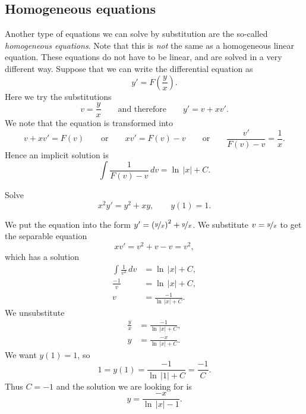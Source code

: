 \subsection{Homogeneous equations}

Another type of equations we can solve by substitution are the 
so-called \emph{homogeneous equations}. Note that this is \emph{not} the same 
as a homogeneous linear equation. These equations do not have to be linear, and are solved in a very different way.
Suppose that we can write the differential equation as
\begin{equation*}
y' = F\left(\frac{y}{x}\right) .
\end{equation*}
Here we try the substitutions
\begin{equation*}
v = \frac{y}{x} \qquad \text{and therefore} \qquad y' = v + x v' .
\end{equation*}
We note that the equation is transformed into
\begin{equation*}
v+ xv' = F(v) \qquad \text{or} \qquad xv' = F(v)-v 
\qquad \text{or} \qquad \frac{v'}{F(v)-v} = \frac{1}{x} .
\end{equation*}
Hence an implicit solution is
\begin{equation*}
\int \frac{1}{F(v)-v} \,dv = \ln \, \lvert x \rvert + C .
\end{equation*}

\begin{example}
Solve 
\begin{equation*}
x^2y' = y^2+xy, \qquad y(1)=1.
\end{equation*}
\end{example}

\begin{exampleSol}
We put the equation into
the form $y'= {\left(\nicefrac{y}{x}\right)}^2+\nicefrac{y}{x}$.  We 
substitute $v=\nicefrac{y}{x}$ to get
the separable equation
\begin{equation*}
xv' = v^2+v-v = v^2 ,
\end{equation*}
which has a solution
\begin{align*}
\int \frac{1}{v^2} \,dv &= \ln \, \lvert x \rvert + C , \\
\frac{-1}{v} &= \ln \, \lvert x \rvert + C , \\
v &= \frac{-1}{\ln \, \lvert x \rvert + C} .
\end{align*}
We unsubstitute
\begin{align*}
\frac{y}{x} &= \frac{-1}{\ln \, \lvert x \rvert + C} , \\
y &= \frac{-x}{\ln \, \lvert x \rvert + C} .
\end{align*}
We want $y(1)=1$, so 
\begin{equation*}
1 = y(1) = \frac{-1}{\ln \, \lvert 1 \rvert + C} = \frac{-1}{C} .
\end{equation*}
Thus $C = -1$ and
the solution we are looking for is
\begin{equation*}
y = \frac{-x}{\ln \, \lvert x \rvert -1} .
\end{equation*}
\end{exampleSol}

